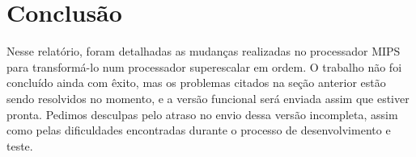 \documentclass[12pt,a4paper]{article}
\numberwithin{equation}{section}
\begin{document}
\section{Conclusão}

Nesse relatório, foram detalhadas as mudanças realizadas no processador MIPS para transformá-lo num processador superescalar em ordem. O trabalho não foi concluído ainda com êxito, mas os problemas citados na seção anterior estão sendo resolvidos no momento, e a versão funcional será enviada assim que estiver pronta. Pedimos desculpas pelo atraso no envio dessa versão incompleta, assim como pelas dificuldades encontradas durante o processo de desenvolvimento e teste.
\end{document}
